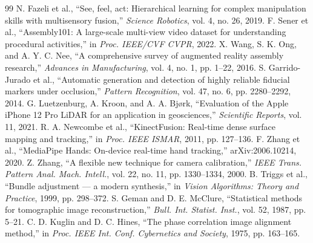 \documentclass[12pt,a4paper]{article}
\begin{document}
\begin{thebibliography}{99}\footnotesize\singlespacing\setlength{\itemsep}{0pt}
 N. Fazeli et al., ``See, feel, act: Hierarchical learning for complex manipulation skills with multisensory fusion,'' \emph{Science Robotics}, vol. 4, no. 26, 2019.
 F. Sener et al., ``Assembly101: A large-scale multi-view video dataset for understanding procedural activities,'' in \emph{Proc. IEEE/CVF CVPR}, 2022.
 X. Wang, S. K. Ong, and A. Y. C. Nee, ``A comprehensive survey of augmented reality assembly research,'' \emph{Advances in Manufacturing}, vol. 4, no. 1, pp. 1--22, 2016.
 S. Garrido-Jurado et al., ``Automatic generation and detection of highly reliable fiducial markers under occlusion,'' \emph{Pattern Recognition}, vol. 47, no. 6, pp. 2280--2292, 2014.
 G. Luetzenburg, A. Kroon, and A. A. Bj\o rk, ``Evaluation of the Apple iPhone 12 Pro LiDAR for an application in geosciences,'' \emph{Scientific Reports}, vol. 11, 2021.
 R. A. Newcombe et al., ``KinectFusion: Real-time dense surface mapping and tracking,'' in \emph{Proc. IEEE ISMAR}, 2011, pp. 127--136.
 F. Zhang et al., ``MediaPipe Hands: On-device real-time hand tracking,'' arXiv:2006.10214, 2020.
 Z. Zhang, ``A flexible new technique for camera calibration,'' \emph{IEEE Trans. Pattern Anal. Mach. Intell.}, vol. 22, no. 11, pp. 1330--1334, 2000.
 B. Triggs et al., ``Bundle adjustment --- a modern synthesis,'' in \emph{Vision Algorithms: Theory and Practice}, 1999, pp. 298--372.
 S. Geman and D. E. McClure, ``Statistical methods for tomographic image reconstruction,'' \emph{Bull. Int. Statist. Inst.}, vol. 52, 1987, pp. 5--21.
 C. D. Kuglin and D. C. Hines, ``The phase correlation image alignment method,'' in \emph{Proc. IEEE Int. Conf. Cybernetics and Society}, 1975, pp. 163--165.
\end{thebibliography}
\end{document}
